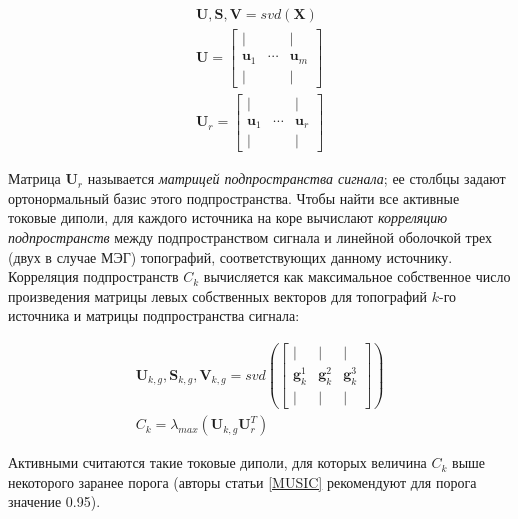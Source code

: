 \begin{gather}
    \mathbf{U}, \mathbf{S}, \mathbf{V} = svd(\mathbf{X}) \\
    \mathbf{U} =
        \begin{bmatrix}
            |                 &               & |            \\
            \mathbf{u}_1      & \cdots        & \mathbf{u}_m \\
            |                 &               & |
        \end{bmatrix}\\
    \mathbf{U}_r = 
        \begin{bmatrix}
            |                 &               & |            \\
            \mathbf{u}_1      & \cdots        & \mathbf{u}_r \\
            |                 &               & |
        \end{bmatrix}
\end{gather}

Матрица $\mathbf{U}_r$ называется \emph{матрицей подпространства сигнала};
ее столбцы задают ортонормальный базис этого подпространства.
Чтобы найти все активные токовые диполи, для каждого источника на коре
вычислают \emph{корреляцию подпространств} между подпространством сигнала и
линейной оболочкой трех (двух в случае МЭГ) топографий, соответствующих данному источнику.
Корреляция подпространств $C_k$ вычисляется как максимальное собственное число
произведения матрицы левых собственных векторов для топографий $k$-го источника
и матрицы подпространства сигнала:

\begin{gather}
    \mathbf{U}_{k,g}, \mathbf{S}_{k,g}, \mathbf{V}_{k,g} = svd\left(
            \begin{bmatrix}
                |                 & |              & |              \\
                \mathbf{g}_k^1    & \mathbf{g}_k^2 & \mathbf{g}_k^3 \\
                |                 & |              & |
            \end{bmatrix}
     \right)\\
     C_k = \lambda_{max}(\mathbf{U}_{k,g} \mathbf{U}_r^T)
\end{gather}

Активными считаются такие токовые диполи, для которых величина $C_k$ выше некоторого
заранее порога (авторы статьи \ref{MUSIC} рекомендуют для порога значение 0.95).

